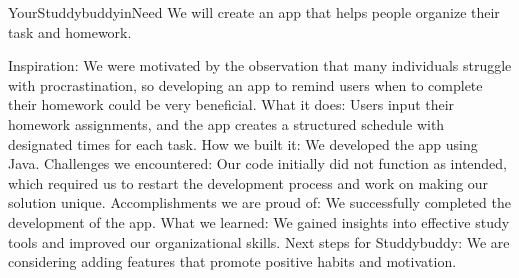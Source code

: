 YourStuddybuddyinNeed
We will create an app that helps people organize their task and homework.

Inspiration: We were motivated by the observation that many individuals struggle with procrastination, so developing an app to remind users when to complete their homework could be very beneficial.
What it does: Users input their homework assignments, and the app creates a structured schedule with designated times for each task.
How we built it: We developed the app using Java.
Challenges we encountered: Our code initially did not function as intended, which required us to restart the development process and work on making our solution unique.
Accomplishments we are proud of: We successfully completed the development of the app.
What we learned: We gained insights into effective study tools and improved our organizational skills.
Next steps for Studdybuddy: We are considering adding features that promote positive habits and motivation.
